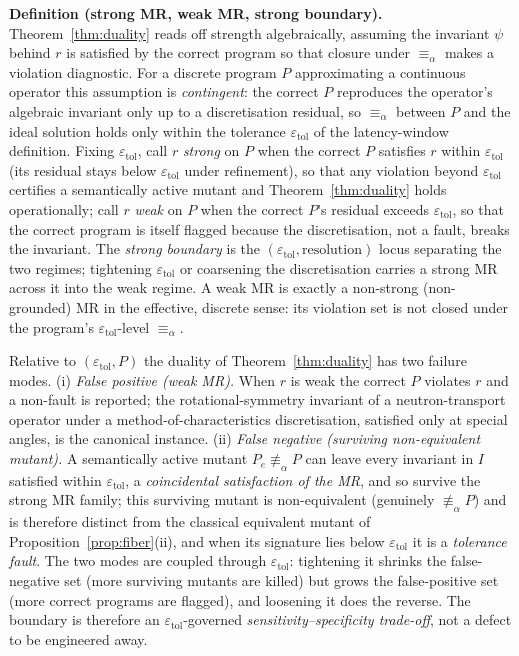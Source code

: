 \documentclass[manuscript,screen,review]{acmart}
\begin{document}
\textbf{Definition (strong MR, weak MR, strong boundary).} Theorem~\ref{thm:duality}
reads off strength algebraically, assuming the invariant $\psi$ behind
$r$ is satisfied by the correct program so that closure under
$\equiv_\alpha$ makes a violation diagnostic. For a discrete program $P$
approximating a continuous operator this assumption is \emph{contingent}:
the correct $P$ reproduces the operator's algebraic invariant only up to
a discretisation residual, so $\equiv_\alpha$ between $P$ and the ideal
solution holds only within the tolerance $\varepsilon_{\mathrm{tol}}$ of
the latency-window definition. Fixing $\varepsilon_{\mathrm{tol}}$, call
$r$ \emph{strong} on $P$ when the correct $P$ satisfies $r$ within
$\varepsilon_{\mathrm{tol}}$ (its residual stays below
$\varepsilon_{\mathrm{tol}}$ under refinement), so that any violation
beyond $\varepsilon_{\mathrm{tol}}$ certifies a semantically active
mutant and Theorem~\ref{thm:duality} holds operationally; call $r$ \emph{weak} on $P$
when the correct $P$'s residual exceeds $\varepsilon_{\mathrm{tol}}$, so
that the correct program is itself flagged because the discretisation,
not a fault, breaks the invariant. The \emph{strong boundary} is the
$(\varepsilon_{\mathrm{tol}}, \text{resolution})$ locus separating the
two regimes; tightening $\varepsilon_{\mathrm{tol}}$ or coarsening the
discretisation carries a strong MR across it into the weak regime. A weak
MR is exactly a non-strong (non-grounded) MR in the effective, discrete
sense: its violation set is not closed under the program's
$\varepsilon_{\mathrm{tol}}$-level $\equiv_\alpha$.

\begin{proposition}\label{prop:boundary}
Relative to
$(\varepsilon_{\mathrm{tol}}, P)$ the duality of Theorem~\ref{thm:duality} has two
failure modes. (i) \emph{False positive (weak MR).} When $r$ is weak the
correct $P$ violates $r$ and a non-fault is reported; the
rotational-symmetry invariant of a neutron-transport operator under a
method-of-characteristics discretisation, satisfied only at special
angles, is the canonical instance. (ii) \emph{False negative (surviving
non-equivalent mutant).} A semantically active mutant
$P_e \not\equiv_\alpha P$ can leave every invariant in $I$ satisfied
within $\varepsilon_{\mathrm{tol}}$, a \emph{coincidental satisfaction
of the MR}, and so survive the strong MR family; this surviving mutant
is non-equivalent (genuinely $\not\equiv_\alpha P$) and is therefore
distinct from the classical equivalent mutant of Proposition~\ref{prop:fiber}(ii), and
when its signature lies below $\varepsilon_{\mathrm{tol}}$ it is a
\emph{tolerance fault}. The two modes are coupled through
$\varepsilon_{\mathrm{tol}}$: tightening it shrinks the false-negative
set (more surviving mutants are killed) but grows the false-positive set
(more correct programs are flagged), and loosening it does the reverse.
The boundary is therefore an $\varepsilon_{\mathrm{tol}}$-governed
\emph{sensitivity--specificity trade-off}, not a defect to be engineered
away.
\end{proposition}
\end{document}
